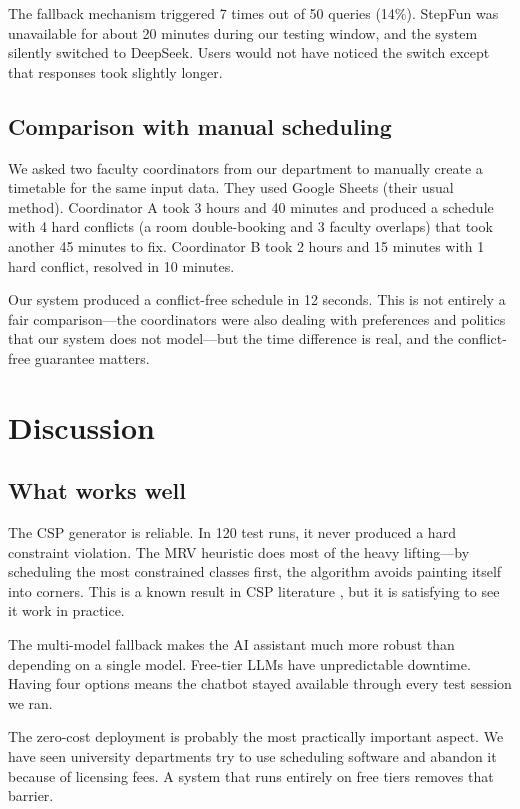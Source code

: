 \documentclass[conference]{IEEEtran}
\begin{document}
The fallback mechanism triggered 7 times out of 50 queries (14\%). StepFun was unavailable for about 20 minutes during our testing window, and the system silently switched to DeepSeek. Users would not have noticed the switch except that responses took slightly longer.

\subsection{Comparison with manual scheduling}

We asked two faculty coordinators from our department to manually create a timetable for the same input data. They used Google Sheets (their usual method). Coordinator A took 3 hours and 40 minutes and produced a schedule with 4 hard conflicts (a room double-booking and 3 faculty overlaps) that took another 45 minutes to fix. Coordinator B took 2 hours and 15 minutes with 1 hard conflict, resolved in 10 minutes.

Our system produced a conflict-free schedule in 12 seconds. This is not entirely a fair comparison---the coordinators were also dealing with preferences and politics that our system does not model---but the time difference is real, and the conflict-free guarantee matters.


\section{Discussion}

\subsection{What works well}

The CSP generator is reliable. In 120 test runs, it never produced a hard constraint violation. The MRV heuristic does most of the heavy lifting---by scheduling the most constrained classes first, the algorithm avoids painting itself into corners. This is a known result in CSP literature \cite{dechter2003constraint}, but it is satisfying to see it work in practice.

The multi-model fallback makes the AI assistant much more robust than depending on a single model. Free-tier LLMs have unpredictable downtime. Having four options means the chatbot stayed available through every test session we ran.

The zero-cost deployment is probably the most practically important aspect. We have seen university departments try to use scheduling software and abandon it because of licensing fees. A system that runs entirely on free tiers removes that barrier.
\end{document}
